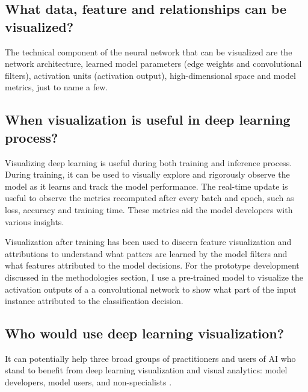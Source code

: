 \subsection*{What data, feature and relationships can be visualized?}

The technical component of the neural network that can be visualized are the network architecture, learned model parameters (edge weights and convolutional filters),  activation units (activation output), high-dimensional space and model metrics, just to name a few.

\subsection*{When visualization is useful in deep learning process?}

Visualizing deep learning is useful during both training and inference process. During training, it can be used to visually explore and rigorously observe the model as it learns and track the model performance. The real-time update is useful to observe the metrics recomputed after every batch and epoch, such as loss, accuracy and training time. These metrics aid the model developers with various insights.

Visualization after training has been used to discern feature visualization \cite{featurevis} and attributions \cite{Olah2018} to understand what patters are learned by the model filters and what features attributed to the model decisions. For the prototype development discussed in the methodologies section, I use a pre-trained model to visualize the activation outputs of a a convolutional network to show what part of the input instance attributed to the classification decision.

\subsection*{Who would use deep learning visualization?}

It can potentially help three broad groups of practitioners and users of AI who stand to benefit from deep learning visualization and visual analytics: model developers, model users, and non-specialists \cite{Choo2018}.





